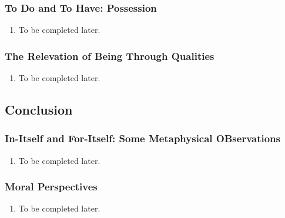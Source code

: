 \subsubsection{To Do and To Have: Possession}

\begin{enumerate}
  \item To be completed later.
\end{enumerate}

\subsubsection{The Relevation of Being Through Qualities}

\begin{enumerate}
  \item To be completed later.
\end{enumerate}

\subsection{Conclusion}

\subsubsection{In-Itself and For-Itself: Some Metaphysical OBservations}

\begin{enumerate}
  \item To be completed later.
\end{enumerate}

\subsubsection{Moral Perspectives}

\begin{enumerate}
  \item To be completed later.
\end{enumerate}

